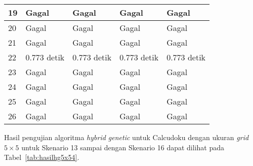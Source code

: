 \begin{table}
\begin{tabular}{| l | l | l | l | l |}
\hline
19 & Gagal & Gagal & Gagal & Gagal \\
\hline
20 & Gagal & Gagal & Gagal & Gagal \\
\hline
21 & Gagal & Gagal & Gagal & Gagal \\
\hline
22 & 0.773 detik & 0.773 detik & 0.773 detik & 0.773 detik \\
\hline
23 & Gagal & Gagal & Gagal & Gagal \\
\hline
24 & Gagal & Gagal & Gagal & Gagal \\
\hline
25 & Gagal & Gagal & Gagal & Gagal \\
\hline
26 & Gagal & Gagal & Gagal & Gagal \\
\hline
\end{tabular}
\label{tab:hasilhg5x53}
\end{table}

Hasil pengujian algoritma \textit{hybrid genetic} untuk Calcudoku dengan ukuran \textit{grid} \begin{math}5 \times 5\end{math} untuk Skenario 13 sampai dengan Skenario 16 dapat dilihat pada Tabel~\ref{tab:hasilhg5x54}.

